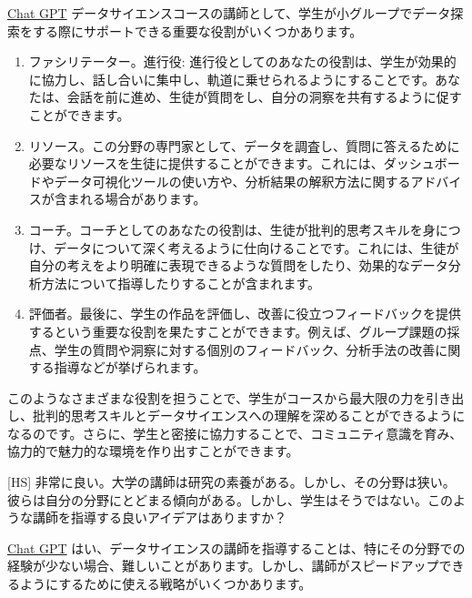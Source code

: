 \documentclass[
]{book}
\theoremstyle{definition}
\theoremstyle{definition}
\theoremstyle{definition}
\theoremstyle{definition}
\theoremstyle{remark}
\begin{document}
\protect\hyperlink{chatgpt}{Chat GPT} データサイエンスコースの講師として、学生が小グループでデータ探索をする際にサポートできる重要な役割がいくつかあります。

\begin{enumerate}
\def\labelenumi{\arabic{enumi}.}
\item
  ファシリテーター。進行役: 進行役としてのあなたの役割は、学生が効果的に協力し、話し合いに集中し、軌道に乗せられるようにすることです。あなたは、会話を前に進め、生徒が質問をし、自分の洞察を共有するように促すことができます。
\item
  リソース。この分野の専門家として、データを調査し、質問に答えるために必要なリソースを生徒に提供することができます。これには、ダッシュボードやデータ可視化ツールの使い方や、分析結果の解釈方法に関するアドバイスが含まれる場合があります。
\item
  コーチ。コーチとしてのあなたの役割は、生徒が批判的思考スキルを身につけ、データについて深く考えるように仕向けることです。これには、生徒が自分の考えをより明確に表現できるような質問をしたり、効果的なデータ分析方法について指導したりすることが含まれます。
\item
  評価者。最後に、学生の作品を評価し、改善に役立つフィードバックを提供するという重要な役割を果たすことができます。例えば、グループ課題の採点、学生の質問や洞察に対する個別のフィードバック、分析手法の改善に関する指導などが挙げられます。
\end{enumerate}

このようなさまざまな役割を担うことで、学生がコースから最大限の力を引き出し、批判的思考スキルとデータサイエンスへの理解を深めることができるようになるのです。さらに、学生と密接に協力することで、コミュニティ意識を育み、協力的で魅力的な環境を作り出すことができます。

{[}HS{]} 非常に良い。大学の講師は研究の素養がある。しかし、その分野は狭い。彼らは自分の分野にとどまる傾向がある。しかし、学生はそうではない。このような講師を指導する良いアイデアはありますか？

\protect\hyperlink{chatgpt}{Chat GPT} はい、データサイエンスの講師を指導することは、特にその分野での経験が少ない場合、難しいことがあります。しかし、講師がスピードアップできるようにするために使える戦略がいくつかあります。
\end{document}
